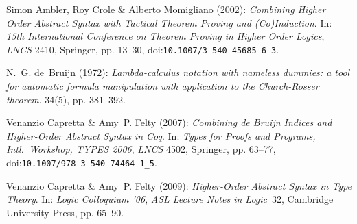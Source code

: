 \documentclass[copyright,creativecommons]{eptcs}
\begin{document}
\begin{thebibliography}{10}
\providecommand{\bibitemdeclare}[2]{}
\providecommand{\urlprefix}{Available at }
\providecommand{\url}[1]{\texttt{#1}}
\providecommand{\href}[2]{\texttt{#2}}
\providecommand{\urlalt}[2]{\href{#1}{#2}}
\providecommand{\doi}[1]{doi:\urlalt{http://dx.doi.org/#1}{#1}}
\providecommand{\bibinfo}[2]{#2}

\bibitemdeclare{inproceedings}{ambler/crole/momigliano:2002}
\bibinfo{author}{Simon Ambler}, \bibinfo{author}{Roy Crole} \&
  \bibinfo{author}{Alberto Momigliano} (\bibinfo{year}{2002}):
  \emph{\bibinfo{title}{Combining Higher Order Abstract Syntax with Tactical
  Theorem Proving and (Co)Induction}}.
\newblock In: {\sl \bibinfo{booktitle}{15th International Conference on Theorem
  Proving in Higher Order Logics}}, {\sl \bibinfo{series}{LNCS}}
  \bibinfo{volume}{2410}, \bibinfo{publisher}{Springer}, pp.
  \bibinfo{pages}{13--30}, \doi{10.1007/3-540-45685-6\_3}.

\bibitemdeclare{article}{debruijn:1972}
\bibinfo{author}{N.~G. de~Bruijn} (\bibinfo{year}{1972}):
  \emph{\bibinfo{title}{Lambda-calculus notation with nameless dummies: a tool
  for automatic formula manipulation with application to the {Church-Rosser}
  theorem}}.
\newblock {\sl \bibinfo{journal}{Indagationes Mathematicae}}
  \bibinfo{volume}{34}(\bibinfo{number}{5}), pp. \bibinfo{pages}{381--392}.

\bibitemdeclare{inproceedings}{capretta/felty:2006}
\bibinfo{author}{Venanzio Capretta} \& \bibinfo{author}{Amy~P. Felty}
  (\bibinfo{year}{2007}): \emph{\bibinfo{title}{Combining de {B}ruijn Indices
  and Higher-Order Abstract Syntax in {C}oq}}.
\newblock In: {\sl \bibinfo{booktitle}{Types for Proofs and Programs, Intl.\
  Workshop, TYPES 2006}}, {\sl \bibinfo{series}{LNCS}} \bibinfo{volume}{4502},
  \bibinfo{publisher}{Springer}, pp. \bibinfo{pages}{63--77},
  \doi{10.1007/978-3-540-74464-1\_5}.

\bibitemdeclare{inproceedings}{capretta/felty:2009}
\bibinfo{author}{Venanzio Capretta} \& \bibinfo{author}{Amy~P. Felty}
  (\bibinfo{year}{2009}): \emph{\bibinfo{title}{Higher-Order Abstract Syntax in
  Type Theory}}.
\newblock In: {\sl \bibinfo{booktitle}{Logic Colloquium '06}}, {\sl
  \bibinfo{series}{ASL Lecture Notes in Logic}}~\bibinfo{volume}{32},
  \bibinfo{publisher}{Cambridge University Press}, pp. \bibinfo{pages}{65--90}.


\end{thebibliography}
\end{document}
